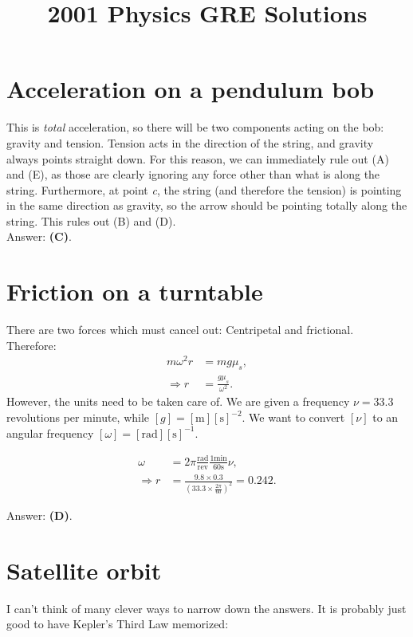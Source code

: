\documentclass[11pt]{paper}
\title{2001 Physics GRE Solutions\blfootnote{Alex Deich, July 2016}}
\author{}
\newcommand{\answer}[1]{Answer: \textbf{(#1)}.}
\begin{document}
\maketitle
\tableofcontents
\newpage
\section{Acceleration on a pendulum bob}
This is \emph{total} acceleration, so there will be two components acting on the bob: gravity and tension.  Tension acts in the direction of the string, and gravity always points straight down.  For this reason, we can immediately rule out (A) and (E), as those are clearly ignoring any force other than what is along the string.  Furthermore, at point \emph{c}, the string (and therefore the tension) is pointing in the same direction as gravity, so the arrow should be pointing totally along the string.  This rules out (B) and (D).\\

\answer{C}

\section{Friction on a turntable}
There are two forces which must cancel out:  Centripetal and frictional.\\
Therefore:
\begin{align}
m \omega^2 r &= m g \mu_s,\\
\Rightarrow r &= \frac{g \mu_s}{\omega^2}.
\end{align}
However, the units need to be taken care of.  We are given a frequency $\nu = 33.3$ revolutions per minute, while $[g] = [\text{m}][\text{s}]^{-2}$.  We want to convert $[\nu]$ to an angular frequency $[\omega] = [\text{rad}][\text{s}]^{-1}$.

\begin{align}
\omega &= 2 \pi \frac{\text{rad}}{\text{rev}} \frac{1 \text{min}}{60 \text{s}} \nu,\\
\Rightarrow r &= \frac{9.8 \times 0.3}{\left(33.3 \times \frac{2 \pi}{60} \right)^2} = 0.242.
\end{align}

\answer{D}

\section{Satellite orbit}
I can't think of many clever ways to narrow down the answers.  It is probably just good to have Kepler's Third Law memorized:
\end{document}
